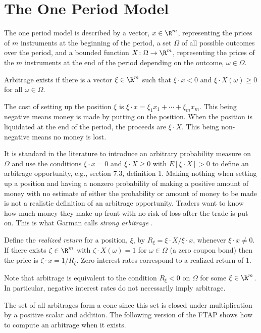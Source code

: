 \section{The One Period Model}
The one period model is described by a vector, $x\in\R^m$, representing
the prices of $m$ instruments at the beginning of the period, a set
$\Omega$ of all possible outcomes over the period, and a bounded function
$X\colon\Omega\to\R^m$, representing the prices of the $m$ instruments
at the end of the period depending on the outcome, $\omega\in\Omega$.

\begin{definition}
Arbitrage exists if there is a vector $\xi\in\R^m$ such that
$\xi\cdot x < 0$ and $\xi\cdot X(\omega)\ge0$ for all $\omega\in\Omega$.
\end{definition}

The cost of setting up the position $\xi$ is $\xi\cdot x = \xi_1 x_1 +
\cdots + \xi_m x_m$. This being negative means money is made by putting on
the position. When the position is liquidated at the end of the period,
the proceeds are $\xi\cdot X$. This being non-negative means no money
is lost.

It is standard in the literature to introduce an arbitrary probability
measure on $\Omega$ and use the conditions $\xi\cdot x = 0$ and $\xi\cdot
X\ge0$ with $E[\xi\cdot X]>0$ to define an arbitrage opportunity, e.g.,
\cite{ShiKabKraMel1994} section 7.3, definition 1.  Making nothing
when setting up a position and having a nonzero probability of making a
positive amount of money with no estimate of either the probability or
amount of money to be made is not a realistic definition of an arbitrage
opportunity.  Traders want to know how much money they make up-front
with no risk of loss after the trade is put on.  %
This is what Garman calls {\em strong arbitrage} \cite{Gar1985}.

Define the \emph{realized return} for a position, $\xi$, by
$R_\xi = \xi\cdot X/\xi\cdot x$,
whenever $\xi\cdot x\not=0$. If there exists $\zeta\in\R^m$
with $\zeta\cdot X(\omega) = 1$ for $\omega\in\Omega$ (a 
zero coupon bond) then the price is $\zeta\cdot x = 1/R_\zeta$.
Zero interest rates correspond to a realized return of 1.

Note that arbitrage is equivalent to
the condition $R_\xi < 0$ on $\Omega$ for some $\xi\in\R^m$.
In particular, negative interest rates do not necessarily imply arbitrage. 

The set of all arbitrages form a cone since this set is closed
under multiplication by a positive scalar and addition. The following 
version of the FTAP shows how to compute an arbitrage when it exists.

